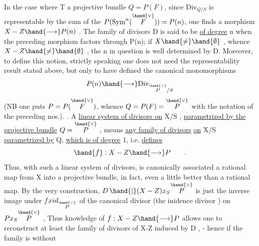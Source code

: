 In the case where T  a projective bundle $Q=P(F)$, since $\mathrm{Div}_{Q/S}$
is representable by the sum of the $P(\mathrm{Sym}^n(\overset{\hand{\vee}}{F})) = P(n)$, one finds
a morphism $X-Z \hand{\longrightarrow} P(n)$ . The family of divisors
D is said to be \uline{of degree} n when the preceding morphism factors through P(n); if
$X \hand{\neq} \hand{\emptyset}$ , whence $X-Z \hand{\neq} \hand{\emptyset}$ , the n in question is well determined by D. Moreover,
to define this notion, strictly speaking one does not need the representability
result stated above, but only to have defined
the canonical monomorphisms
\[ P(n) \hand{\longrightarrow} \mathrm{Div}_{\overset{\hand{\vee}}{P}/S} \]
(NB one puts $P = P(\overset{\hand{\vee}}{F})$, whence $Q = P(F) = \overset{\hand{\vee}}{P}$ with the notation of the preceding nos.).
. A \uline{linear system of divisors on} X/S , \uline{parametrized
by the projective bundle} $Q = \overset{\hand{\vee}}{P}$ , means \uline{any family of divisors} \uline{on} X/S
\uline{parametrized by} Q, \uline{which is of degree} 1, i.e. \uline{defines}
\[ \hand{f} : X-Z \hand{\longrightarrow} P \qquad . \]
Thus, with such a linear system of divisors, is canonically associated
a rational map from X into a projective bundle, \hand{(}in fact, even a little
better than a rational map\hand{)}. By the very construction,
$D\,\hand{|}(X-Z)x_S\overset{\hand{\vee}}{P}$ is just the inverse image under $f x id_{\overset{\hand{\vee}}{P}}$ of the
canonical divisor (the inidence divisor ) on $Px_S\overset{\hand{\vee}}{P}$ , Thus knowledge
of $f: X-Z \hand{\longrightarrow} P$ allows one to reconstruct  at least the family
of divisors of X-Z induced by D , - hence if the family is without
